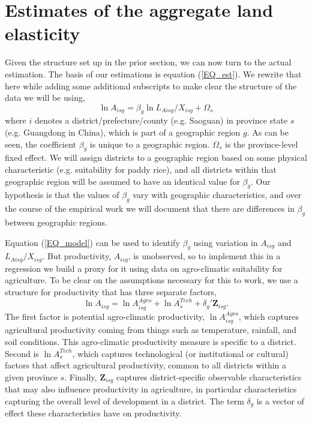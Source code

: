 \documentclass[11pt]{article}
\begin{document}
\section{Estimates of the aggregate land elasticity}
Given the structure set up in the prior section, we can now turn to the actual estimation. The basis of our estimations is equation (\ref{EQ_est}). We rewrite that here while adding some additional subscripts to make clear the structure of the data we will be using,
\begin{equation}
\ln A_{isg} = \beta_g \ln L_{Aisg}/X_{isg} + \Omega_s \label{EQ_model}
\end{equation}
where $i$ denotes a district/prefecture/county (e.g. Saoguan) in province state $s$ (e.g. Guangdong in China), which is part of a geographic region $g$. As can be seen, the coefficient $\beta_g$ is unique to a geographic region. $\Omega_s$ is the province-level fixed effect. We will assign districts to a geographic region based on some physical characteristic (e.g. suitability for paddy rice), and all districts within that geographic region will be assumed to have an identical value for $\beta_g$. Our hypothesis is that the values of $\beta_g$ vary with geographic characteristics, and over the course of the empirical work we will document that there are differences in $\beta_g$ between geographic regions.

Equation (\ref{EQ_model}) can be used to identify $\beta_g$ using variation in $A_{isg}$ and $L_{Aisg}/X_{isg}$. But productivity, $A_{isg}$, is unobserved, so to implement this in a regression we build a proxy for it using data on agro-climatic suitability for agriculture. To be clear on the assumptions necessary for this to work, we use a structure for productivity that has three separate factors,
\begin{equation}
	\ln A_{isg} = \ln A_{isg}^{Agro} + \ln A_{s}^{Tech} + \delta_g' \mathbf{Z}_{isg}. \label{EQ_prod}
\end{equation}
The first factor is potential agro-climatic productivity, $\ln A_{isg}^{Agro}$, which captures agricultural productivity coming from things such as temperature, rainfall, and soil conditions. This agro-climatic productivity measure is specific to a district. Second is $\ln A_{s}^{Tech}$, which captures technological (or institutional or cultural) factors that affect agricultural productivity, common to all districts within a given province $s$. Finally, $\mathbf{Z}_{isg}$ captures district-specific observable characteristics that may also influence productivity in agriculture, in particular characteristics capturing the overall level of development in a district. The term $\delta_g$ is a vector of effect these characteristics have on productivity.
\end{document}
